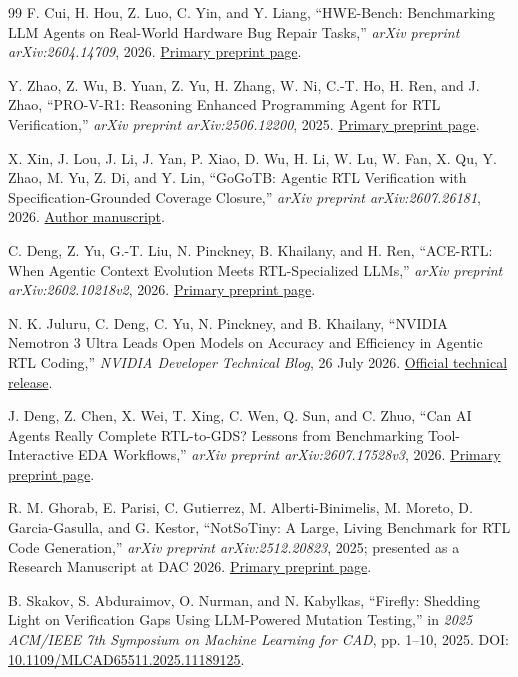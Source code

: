 \documentclass[UTF8,a4paper,zihao=-4,oneside]{ctexart}
\begin{document}
\begin{thebibliography}{99}
F. Cui, H. Hou, Z. Luo, C. Yin, and Y. Liang,
``HWE-Bench: Benchmarking LLM Agents on Real-World Hardware Bug Repair Tasks,''
\emph{arXiv preprint arXiv:2604.14709}, 2026.
\href{https://arxiv.org/abs/2604.14709}{Primary preprint page}.

Y. Zhao, Z. Wu, B. Yuan, Z. Yu, H. Zhang, W. Ni, C.-T. Ho, H. Ren, and J. Zhao,
``PRO-V-R1: Reasoning Enhanced Programming Agent for RTL Verification,''
\emph{arXiv preprint arXiv:2506.12200}, 2025.
\href{https://arxiv.org/abs/2506.12200}{Primary preprint page}.

X. Xin, J. Lou, J. Li, J. Yan, P. Xiao, D. Wu, H. Li, W. Lu, W. Fan, X. Qu,
Y. Zhao, M. Yu, Z. Di, and Y. Lin,
``GoGoTB: Agentic RTL Verification with Specification-Grounded Coverage Closure,''
\emph{arXiv preprint arXiv:2607.26181}, 2026.
\href{https://arxiv.org/abs/2607.26181}{Author manuscript}.

C. Deng, Z. Yu, G.-T. Liu, N. Pinckney, B. Khailany, and H. Ren,
``ACE-RTL: When Agentic Context Evolution Meets RTL-Specialized LLMs,''
\emph{arXiv preprint arXiv:2602.10218v2}, 2026.
\href{https://arxiv.org/abs/2602.10218}{Primary preprint page}.

N. K. Juluru, C. Deng, C. Yu, N. Pinckney, and B. Khailany,
``NVIDIA Nemotron 3 Ultra Leads Open Models on Accuracy and Efficiency in Agentic RTL Coding,''
\emph{NVIDIA Developer Technical Blog}, 26 July 2026.
\href{https://developer.nvidia.com/blog/nvidia-nemotron-3-ultra-leads-open-models-on-accuracy-and-efficiency-in-agentic-rtl-coding/}{Official technical release}.

J. Deng, Z. Chen, X. Wei, T. Xing, C. Wen, Q. Sun, and C. Zhuo,
``Can AI Agents Really Complete RTL-to-GDS? Lessons from Benchmarking Tool-Interactive EDA Workflows,''
\emph{arXiv preprint arXiv:2607.17528v3}, 2026.
\href{https://arxiv.org/abs/2607.17528}{Primary preprint page}.

R. M. Ghorab, E. Parisi, C. Gutierrez, M. Alberti-Binimelis, M. Moreto,
D. Garcia-Gasulla, and G. Kestor,
``NotSoTiny: A Large, Living Benchmark for RTL Code Generation,''
\emph{arXiv preprint arXiv:2512.20823}, 2025; presented as a Research Manuscript at DAC 2026.
\href{https://arxiv.org/abs/2512.20823}{Primary preprint page}.

B. Skakov, S. Abduraimov, O. Nurman, and N. Kabylkas,
``Firefly: Shedding Light on Verification Gaps Using LLM-Powered Mutation Testing,''
in \emph{2025 ACM/IEEE 7th Symposium on Machine Learning for CAD}, pp. 1--10, 2025.
DOI: \href{https://doi.org/10.1109/MLCAD65511.2025.11189125}{10.1109/MLCAD65511.2025.11189125}.


\end{thebibliography}
\end{document}
